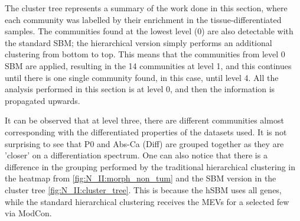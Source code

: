 The cluster tree represents a summary of the work done in this section, where each community was labelled by their enrichment in the tissue-differentiated samples. The communities found at the lowest level (0) are also detectable with the standard SBM; the hierarchical version simply performs an additional clustering from bottom to top. This means that the communities from level 0 SBM are applied, resulting in the 14 communities at level 1, and this continues until there is one single community found, in this case, until level 4. All the analysis performed in this section is at level 0, and then the information is propagated upwards.

It can be observed that at level three, there are different communities almost corresponding with the differentiated properties of the datasets used. It is not surprising to see that P0 and Abs-Ca (Diff) are grouped together as they are 'closer' on a differentiation spectrum. One can also notice that there is a difference in the grouping performed by the traditional hierarchical clustering in the heatmap from \cref{fig:N_II:morph_non_tum} and the SBM version in the cluster tree \cref{fig:N_II:cluster_tree}. This is because the hSBM uses all genes, while the standard hierarchical clustering receives the MEVs for a selected few via ModCon.



